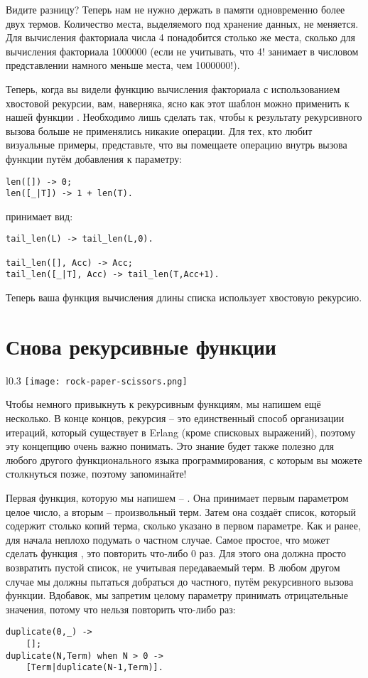 Видите разницу?
Теперь нам не нужно держать в памяти одновременно более двух термов.
Количество места, выделяемого под хранение данных, не меняется.
Для вычисления факториала числа 4 понадобится столько же места, сколько для вычисления факториала 1000000 (если не учитывать, что 4! занимает в числовом представлении намного меньше места, чем 1000000!).

Теперь, когда вы видели функцию вычисления факториала с использованием хвостовой рекурсии, вам, наверняка, ясно как этот шаблон можно применить к нашей функции .
Необходимо лишь сделать так, чтобы к результату рекурсивного вызова больше не применялись никакие операции.
Для тех, кто любит визуальные примеры, представьте, что вы помещаете операцию  внутрь вызова функции путём добавления к параметру:
\begin{lstlisting}[style=erlang]
len([]) -> 0;
len([_|T]) -> 1 + len(T).
\end{lstlisting}
принимает вид:
\begin{lstlisting}[style=erlang]
tail_len(L) -> tail_len(L,0).
 
tail_len([], Acc) -> Acc;
tail_len([_|T], Acc) -> tail_len(T,Acc+1).
\end{lstlisting}

Теперь ваша функция вычисления длины списка использует хвостовую рекурсию.
\section{Снова рекурсивные функции}
\label{more-recursive-functions}
\begin{wrapfigure}{l}{0.3\linewidth}
    \texttt{[image: rock-paper-scissors.png]}
\end{wrapfigure}
Чтобы немного привыкнуть к рекурсивным функциям, мы напишем ещё несколько.
В конце концов, рекурсия \--- это единственный способ организации итераций, который существует в Erlang (кроме списковых выражений), поэтому эту концепцию очень важно понимать.
Это знание будет также полезно для любого другого функционального языка программирования, с которым вы можете столкнуться позже, поэтому запоминайте!

Первая функция, которую мы напишем \--- .
Она принимает первым параметром целое число, а вторым \--- произвольный терм.
Затем она создаёт список, который содержит столько копий терма, сколько указано в первом параметре.
Как и ранее, для начала неплохо подумать о частном случае.
Самое простое, что может сделать функция , это повторить что\--либо 0 раз.
Для этого она должна просто возвратить пустой список, не учитывая передаваемый терм.
В любом другом случае мы должны пытаться добраться до частного, путём рекурсивного вызова функции.
Вдобавок, мы запретим целому параметру принимать отрицательные значения, потому что нельзя повторить что\--либо  раз:
\begin{lstlisting}[style=erlang]
duplicate(0,_) ->
    [];
duplicate(N,Term) when N > 0 ->
    [Term|duplicate(N-1,Term)].
\end{lstlisting}

